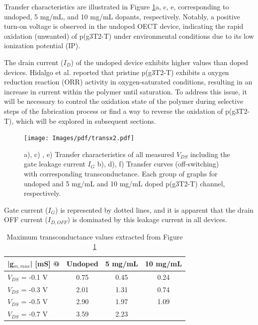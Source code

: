 Transfer characteristics are illustrated in Figure \ref{fig:transx2}a, c, e, corresponding to undoped, 5 mg/mL, and 10 mg/mL dopants, respectively. Notably, a positive turn-on voltage is observed in the undoped OECT device, indicating the rapid oxidation (unwanted) of p(g3T2-T) under environmental conditions due to its low ionization potential (IP). 

The drain current ($I_{D}$) of the undoped device exhibits higher values than doped devices. Hidalgo et al.  \cite{hidalgocastilloSimultaneousPerformanceStability2022a} reported that pristine p(g3T2-T) exhibits a oxygen reduction reaction (ORR) activity in oxygen-saturated conditions, resulting in an increase in current within the polymer until saturation. To address this issue, it will be necessary to control the oxidation state of the polymer during selective steps of the fabrication process or find a way to reverse the oxidation of p(g3T2-T), which will be explored in subsequent sections.

\begin{figure}[!ht]
    \centering
    \texttt{[image: Images/pdf/transx2.pdf]} 
\caption[Transfer characteristics and transconductance at different doping levels and $V_{DS}$]{a), c) , e) Transfer characteristics of all measured $V_{DS}$ including the gate leakage current $I_{G}$ b), d), f) Transfer curves (off-switching) with corresponding transconductance. Each group of graphs for undoped and 5 mg/mL and 10 mg/mL doped p(g3T2-T) channel, respectively.}
    \label{fig:transx2}
\end{figure}
    

Gate current ($I_{G}$) is represented by dotted lines, and it is apparent that the drain OFF current ($I_{D,OFF}$) is dominated by this leakage current in all devices. %

\begin{table}[ht]
\centering
\caption{Maximum transconductance values extracted from Figure \ref{fig:transx2}}
\begin{tabular}{l|c|c|c}
|g$_{m,max}$| [mS] @ & Undoped & 5 mg/mL & 10 mg/mL \\\hline
$V_{DS}$ = -0.1 V & 0.75 & 0.45 & 0.24\\
$V_{DS}$ = -0.3 V & 2.01 & 1.31 & 0.74\\
$V_{DS}$ = -0.5 V & 2.90 & 1.97 & 1.09\\
$V_{DS}$ = -0.7 V & 3.59 & 2.23 & \\ \hline
\end{tabular}
\label{tab:trans}
\end{table}

